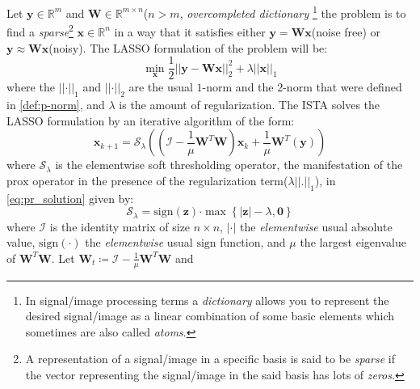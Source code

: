 Let $\boldsymbol{y} \in \mathbb{R}^m$ and $\boldsymbol{W} \in \mathbb{R}^{m \times n}$($n > m$, \emph{overcompleted dictionary}
\footnote{In signal/image processing terms a \emph{dictionary} allows you to represent the desired signal/image as a linear combination of some basic elements which sometimes are also called \emph{atoms}.}
the \srp\index{\srp} problem is to find a \emph{sparse}\footnote{A representation of a signal/image in a specific basis is said to be \emph{sparse} if 
the vector representing the signal/image in the said basis has lots of \emph{zeros}.} 
$\boldsymbol{x} \in \mathbb{R}^n$ in a way that it satisfies either $\boldsymbol{y} = \boldsymbol{W}\boldsymbol{x}$(noise free) or $\boldsymbol{y} \approx \boldsymbol{W}\boldsymbol{x}$(noisy).
The \ac{LASSO}\cite{Hastie2009} formulation of the problem will be:
\begin{equation*}
  \min_{\boldsymbol{x}} \frac{1}{2} \left|\left|\boldsymbol{y}-\boldsymbol{W}\boldsymbol{x}\right|\right|_2^2 + \lambda \left|\left|\boldsymbol{x}\right|\right|_1
\end{equation*}
where the $\left|\left|\boldsymbol{\cdot}\right|\right|_1$ and $\left|\left|\boldsymbol{\cdot}\right|\right|_2$ are the usual $1$-norm and the $2$-norm that were defined in \cref{def:p-norm}, and $\lambda$ is the amount of regularization\cite{Hastie2009}. 
The \ac{ISTA}\cite{Daubechies2003} solves the \ac{LASSO}\cite{Hastie2009} formulation by an iterative algorithm of the form:
\begin{equation*}
  \boldsymbol{x}_{k+1} = \mathcal{S}_\lambda\left(\left(\mathcal{I}-\frac{1}{\mu}\boldsymbol{W}^T\boldsymbol{W}\right)\boldsymbol{x}_k+\frac{1}{\mu}\boldsymbol{W}^T\left(\boldsymbol{y}\right)\right)
\end{equation*}
where $\mathcal{S}_\lambda$ is the elementwise soft thresholding operator, the manifestation of the $\mathrm{prox}$ operator in 
the presence of the regularization term($\lambda\left|\left|\boldsymbol{.}\right|\right|_1$), in \cref{eq:pr_solution} given by:
\begin{equation*}
  \mathcal{S}_\lambda = \mathrm{sign}(\boldsymbol{z}) \boldsymbol{\cdot} \max \left\{\left|\boldsymbol{z}\right|-\lambda,\boldsymbol{0}\right\}
\end{equation*}
where $\mathcal{I}$ is the identity matrix of size $n \times n$, $\left|\boldsymbol{\cdot}\right|$ the \emph{elementwise} usual absolute value, 
$\mathrm{sign}(\boldsymbol{\cdot})$ the \emph{elementwise} usual $\mathrm{sign}$ function, and $\mu$ the largest eigenvalue of $\boldsymbol{W}^T\boldsymbol{W}$. Let $\boldsymbol{W}_t \coloneqq \mathcal{I}-\frac{1}{\mu}\boldsymbol{W}^T\boldsymbol{W}$ and 
